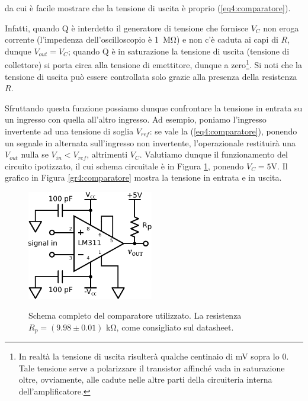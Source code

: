 da cui è facile mostrare che la tensione di uscita è proprio (\ref{eq4:comparatore}).



Infatti, quando Q è interdetto il generatore di tensione che fornisce $V_C$ non eroga corrente (l'impedenza dell'oscilloscopio è \SI{1}{\Mohm}) e non c'è caduta ai capi di $R$, dunque $V_{out}=V_C$; quando Q è in saturazione la tensione di uscita (tensione di collettore) si porta circa alla tensione di emettitore, dunque a zero\footnote{In realtà la tensione di uscita risulterà qualche centinaio di \si{\milli\volt} sopra lo $0$. Tale tensione serve a polarizzare il transistor affinché vada in saturazione oltre, ovviamente, alle cadute nelle altre parti della circuiteria interna dell'amplificatore.}. Si noti che la tensione di uscita può essere controllata solo grazie alla presenza della resistenza $R$.

Sfruttando questa funzione possiamo dunque confrontare la tensione in entrata su un ingresso con quella all'altro ingresso. Ad esempio, poniamo l'ingresso invertente ad una tensione di soglia $V_{ref}$: se vale la (\ref{eq4:comparatore}), ponendo un segnale in alternata sull'ingresso non invertente, l'operazionale restituirà una $V_{out}$ nulla se $V_{in}<V_{ref}$, altrimenti $V_C$. Valutiamo dunque il funzionamento del circuito ipotizzato, il cui schema circuitale è in Figura \ref{cir4:comparatore}, ponendo $V_{C}=5$\si{\volt}. Il grafico in Figura \ref{gr4:comparatore} mostra la tensione in entrata e in uscita.

\begin{figure}[ht]
 \centering
   {\includegraphics[width=5.5cm]{../E04/latex/c_comparatore.pdf}}
 \caption{Schema completo del comparatore utilizzato. La resistenza $R_p=(9.98 \pm 0.01)$ \si{\kilo\ohm}, come consigliato sul datasheet.}
 \label{cir4:comparatore}
\end{figure}

